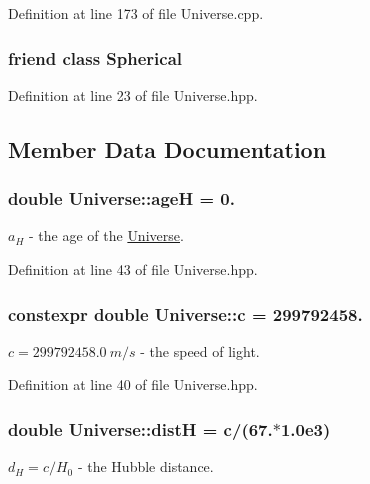 Definition at line 173 of file Universe.\-cpp.

\hypertarget{class_universe_acb9341c7022366ea58f9779acad08e11}{
\subsubsection[{Spherical}]{\setlength{\rightskip}{0pt plus 5cm}friend class {\bf Spherical}\hspace{0.3cm}{\ttfamily [friend]}}}\label{class_universe_acb9341c7022366ea58f9779acad08e11}


Definition at line 23 of file Universe.\-hpp.



\subsection{Member Data Documentation}
\hypertarget{class_universe_a478a9072a4445f6fc3dd9cf2bc641683}{
\subsubsection[{age\-H}]{\setlength{\rightskip}{0pt plus 5cm}double Universe\-::age\-H = 0.}}\label{class_universe_a478a9072a4445f6fc3dd9cf2bc641683}
$ a_{H}$ -\/ the age of the \hyperlink{class_universe}{Universe}. 

Definition at line 43 of file Universe.\-hpp.

\hypertarget{class_universe_a397c3302597d221feaaacac332837fd2}{
\subsubsection[{c}]{\setlength{\rightskip}{0pt plus 5cm}constexpr double Universe\-::c = 299792458.\hspace{0.3cm}{\ttfamily [static]}}}\label{class_universe_a397c3302597d221feaaacac332837fd2}
$c = 299792458.0 \ m/s$ -\/ the speed of light. 

Definition at line 40 of file Universe.\-hpp.

\hypertarget{class_universe_aa9e574f4cac819cfa806f24c24eec60e}{
\subsubsection[{dist\-H}]{\setlength{\rightskip}{0pt plus 5cm}double Universe\-::dist\-H = {\bf c}/(67.$\ast$1.\-0e3)}}\label{class_universe_aa9e574f4cac819cfa806f24c24eec60e}
$d_{H} = c/H_{0}$ -\/ the Hubble distance. 

